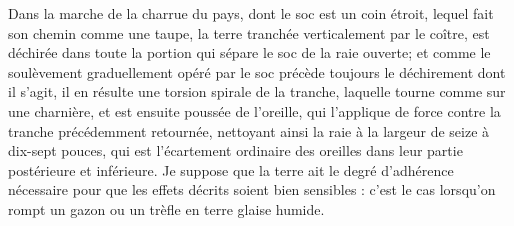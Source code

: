 Dans la marche de la charrue du pays, dont le soc est un coin étroit, lequel fait son chemin comme une taupe, la terre tranchée verticalement par le coître, est déchirée dans toute la portion qui sépare le soc de la raie ouverte; et comme le soulèvement graduellement opéré par le soc précède toujours le déchirement dont il s'agit, il en résulte une torsion spirale de la tranche, laquelle tourne comme sur une\setcounter{page}{365} charnière, et est ensuite poussée de l'oreille, qui l'applique de force contre la tranche précédemment retournée, nettoyant ainsi la raie à la largeur de seize à dix-sept pouces, qui est l'écartement ordinaire des oreilles dans leur partie postérieure et inférieure. Je suppose que la terre ait le degré d'adhérence nécessaire pour que les effets décrits soient bien sensibles : c'est le cas lorsqu'on rompt un gazon ou un trèfle en terre glaise humide.

